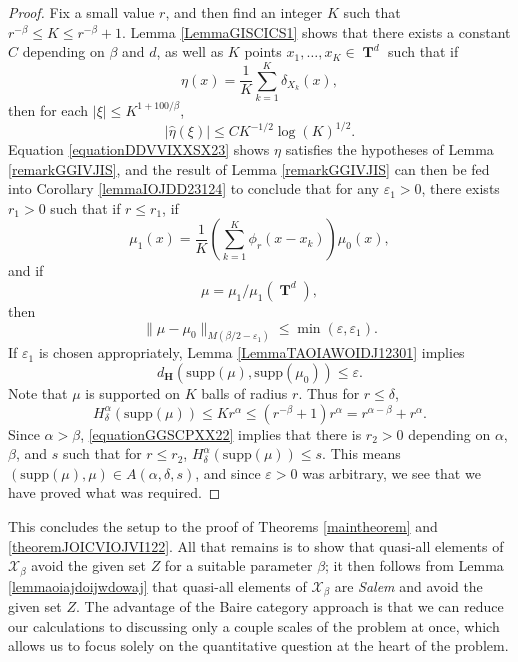 \documentclass[dvipsnames,letterpaper,12pt]{article}
\numberwithin{equation}{section}
\DeclareMathOperator{\TT}{\mathbf{T}}
\numberwithin{theorem}{section}
\begin{document}
\begin{proof}
    Fix a small value $r$, and then find an integer $K$ such that $r^{-\beta} \leq K \leq r^{-\beta} + 1$. Lemma \ref{LemmaGISCICS1} shows that there exists a constant $C$ depending on $\beta$ and $d$, as well as $K$ points $x_1, \dots, x_K \in \TT^d$ such that if
    \[ \eta(x) = \frac{1}{K} \sum_{k = 1}^K \delta_{X_k}(x), \]
    then for each $|\xi| \leq K^{1 + 100/\beta}$,
    \begin{equation} \label{equationDDVVIXXSX23}
        |\widehat{\eta}(\xi)| \leq C K^{-1/2} \log(K)^{1/2}.
    \end{equation}
    Equation \eqref{equationDDVVIXXSX23} shows $\eta$ satisfies the hypotheses of Lemma \ref{remarkGGIVJIS}, and the result of Lemma \ref{remarkGGIVJIS} can then be fed into Corollary \ref{lemmaIOJDD23124} to conclude that for any $\varepsilon_1 > 0$, there exists $r_1 > 0$ such that if $r \leq r_1$, if
    \[ \mu_1(x) = \frac{1}{K} \left( \sum_{k = 1}^K \phi_{r}(x - x_k) \right) \mu_0(x), \]
    and if
    \[ \mu = \mu_1 / \mu_1(\TT^d), \]
    then
    \begin{equation} \label{equationYYUDUSC4434}
        \| \mu - \mu_0 \|_{M(\beta/2 - \varepsilon_1)} \leq \min(\varepsilon,\varepsilon_1).
    \end{equation}
    If $\varepsilon_1$ is chosen appropriately, Lemma \ref{LemmaTAOIAWOIDJ12301} implies
    \begin{equation}
        d_{\mathbf{H}}(\text{supp}(\mu),\text{supp}(\mu_0)) \leq \varepsilon.
    \end{equation}
    Note that $\mu$ is supported on $K$ balls of radius $r$. Thus for $r \leq \delta$,
    \begin{equation} \label{equationGGSCPXX22}
        H^\alpha_\delta(\text{supp}(\mu)) \leq K r^\alpha \leq (r^{-\beta} + 1) r^\alpha = r^{\alpha - \beta} + r^\alpha.
    \end{equation}
    Since $\alpha > \beta$, \eqref{equationGGSCPXX22} implies that there is $r_2 > 0$ depending on $\alpha$, $\beta$, and $s$ such that for $r \leq r_2$, $H^\alpha_\delta(\text{supp}(\mu)) \leq s$. This means $(\text{supp}(\mu),\mu) \in A(\alpha,\delta,s)$, and since $\varepsilon > 0$ was arbitrary, we see that we have proved what was required.
\end{proof}

This concludes the setup to the proof of Theorems \ref{maintheorem} and \ref{theoremJOICVIOJVI122}. All that remains is to show that quasi-all elements of $\mathcal{X}_\beta$ avoid the given set $Z$ for a suitable parameter $\beta$; it then follows from Lemma \ref{lemmaoiajdoijwdowaj} that quasi-all elements of $\mathcal{X}_\beta$ are \emph{Salem} and avoid the given set $Z$. The advantage of the Baire category approach is that we can reduce our calculations to discussing only a couple scales of the problem at once, which allows us to focus solely on the quantitative question at the heart of the problem.
\end{document}
